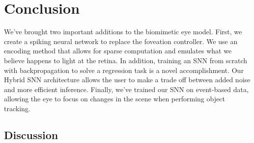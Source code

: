 \documentclass [MS] {UCLAthesis}
\begin{document}








\chapter{Conclusion}

We've brought two important additions to the biomimetic eye model. First, we create a spiking neural network to replace the foveation controller. We use an encoding method that allows for sparse computation and emulates what we believe happens to light at the retina. In addition, training an SNN from scratch with backpropagation to solve a regression task is a novel accomplishment. Our Hybrid SNN architecture allows the user to make a trade off between added noise and more efficient inference. Finally, we've trained our SNN on event-based data, allowing the eye to focus on changes in the scene when performing object tracking.


\section{Discussion}
\end{document}
